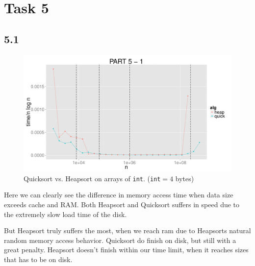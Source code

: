 \documentclass{article}
\begin{document}
%
%
\section*{Task 5}
\subsection*{5.1}
\begin{figure}[H]
    \centering
    \includegraphics[width=
    \textwidth]{images/part5_1.pdf}
    \caption{Quicksort vs. Heapsort on arrays of \texttt{int}. 
    (\texttt{int}$= 4$ bytes)}
\end{figure}
Here we can clearly see the difference in memory access time when data size 
exceeds cache and RAM. Both Heapsort and Quicksort suffers in speed due to the 
extremely slow load time of the disk. 

But Heapsort truly suffers the most, when we reach ram due to Heapsorts natural random memory access behavior.
Quicksort do finish on disk, but still with a great penalty. Heapsort doesn't finish within our time limit, when it reaches sizes that has to be on disk. 
%
%
\end{document}
